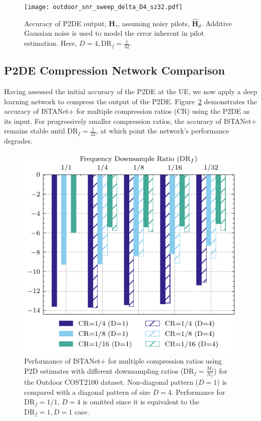 \begin{figure}[!hbtp]
    \centering
    \texttt{[image: outdoor\_snr\_sweep\_delta\_D4\_sz32.pdf]}
    \caption{Accuracy of P2DE output, $\mathbf{H}_{\tau}$, assuming noisy pilots, $\hat{\mathbf{H}}_d$. Additive Gaussian noise is used to model the error inherent in pilot estimation. Here, $D=4, \text{DR}_f=\frac{1}{32}$.}
    \label{fig:snr_sweep}
\end{figure}

\subsection{P2DE Compression Network Comparison}

Having assessed the initial accuracy of the P2DE at the UE, we now apply a deep learning network to compress the output of the P2DE. Figure~\ref{fig:outdoor_drcr_sweep} demonstrates the accuracy of ISTANet+ \cite{ref:zhang2018ista} for multiple compression ratios (CR) using the P2DE as its input. For progressively smaller compression ratios, the accuracy of ISTANet+ remains stable until $\text{DR}_f=\frac{1}{32}$, at which point the network's performance degrades.

\begin{figure}[!hbtp]
    \centering
    \includegraphics{./images/outdoor_drcr_D_sweep.pdf}
    \caption{Performance of ISTANet+ for multiple compression ratios using P2D estimates with different downsampling ratios ($\text{DR}_f=\frac{M_f}{N_f}$) for the Outdoor COST2100 dataset. Non-diagonal pattern ($D=1$) is compared with a diagonal pattern of size $D=4$. Performance for $\text{DR}_f=1/1$, $D=4$ is omitted since it is equivalent to the $\text{DR}_f=1, D=1$ case.}
    \label{fig:outdoor_drcr_sweep}
\end{figure}

